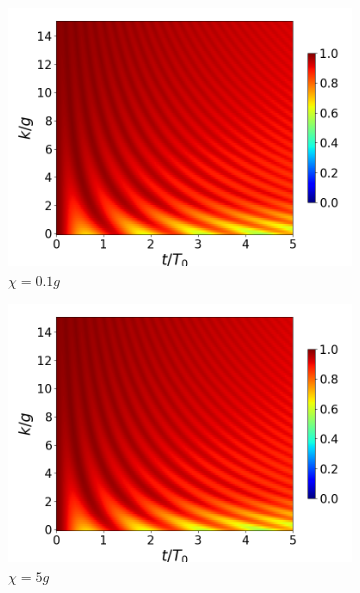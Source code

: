 \begin{figure}[h]
    \centering
    \begin{subfigure}{0.49\textwidth}
        \includegraphics[width=\textwidth]{figuras/ch4/concu/k/eg0+ge0 d=5.0g x=0.0g J=0.0g gamma=0.25g concu k dis.png}
        \caption{$\chi=0.1g$}
        \label{fig4:concu k x1}
    \end{subfigure}
    \hfill
    \begin{subfigure}{0.49\textwidth}
        \includegraphics[width=\textwidth]{figuras/ch4/concu/k/eg0+ge0 d=5.0g x=0.0g J=0.0g gamma=0.25g concu k dis.png}
        \caption{$\chi=5g$}
        \label{fig4:concu k x2}
    \end{subfigure}
    \vfill
    \begin{subfigure}{0.49\textwidth}

\end{subfigure}
\end{figure}
